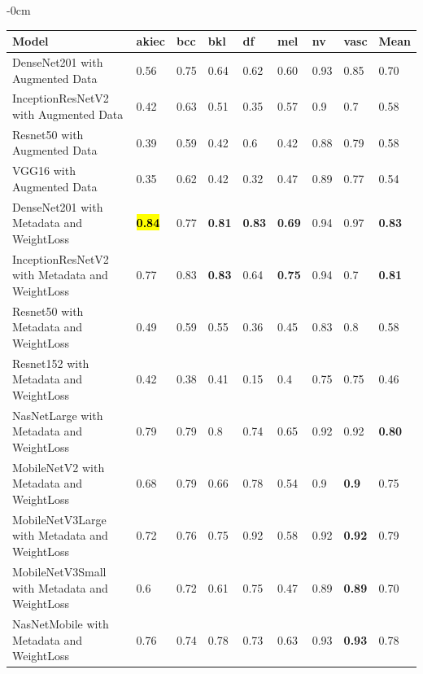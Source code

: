 \documentclass[sensors,article,accept,pdftex,moreauthors]{Definitions/mdpi}
\begin{document}
\begin{table}[H]
\begin{adjustwidth}{-\extralength}{0cm}
\centering
\begin{tabular}{p{9cm}  p{0.8cm}  p{0.8cm}  p{0.6cm}  p{0.6cm}  p{0.6cm}  p{0.6cm}  p{0.8cm}  p{0.9cm}} 
	\toprule
	\textbf{Model} & \textbf{akiec} & \textbf{bcc} & \textbf{bkl} & \textbf{df} & \textbf{mel} & \textbf{nv} & \textbf{vasc} & \textbf{Mean} \\
	\midrule
	DenseNet201 with Augmented Data & 0.56 & 0.75 & 0.64 & 0.62 & 0.60 & 0.93 & 0.85 & 0.70 \\ 
	\midrule
	InceptionResNetV2 with Augmented Data & 0.42 &	0.63 & 0.51 & 0.35 & 0.57 & 0.9 & 0.7 & 0.58\\
	\midrule
	Resnet50 with Augmented Data & 0.39 & 0.59 & 0.42 & 0.6 & 0.42 & 0.88 & 0.79 & 0.58\\
	\midrule 	
	VGG16 with Augmented Data & 0.35 & 0.62 & 0.42 & 0.32 & 0.47 & 0.89 & 0.77 & 0.54\\ 
	\midrule		
	DenseNet201 with Metadata and WeightLoss & \textbf{\hl{0.84} %
} & 0.77 & \textbf{0.81} & \textbf{0.83} & \textbf{0.69} & 0.94 & 0.97 & \textbf{0.83}\\
	\midrule
	InceptionResNetV2 with Metadata and WeightLoss & 0.77 & 0.83 & \textbf{0.83} & 0.64 & \textbf{0.75} & 0.94 & 0.7 & \textbf{0.81}\\
	\midrule
	Resnet50 with Metadata and WeightLoss & 0.49 & 0.59 & 0.55 & 0.36 & 0.45 & 0.83 & 0.8 & 0.58\\
	\midrule
	Resnet152 with Metadata and WeightLoss & 0.42 & 0.38 & 0.41 & 0.15 & 0.4 & 0.75 & 0.75 & 0.46\\
	\midrule
	NasNetLarge with Metadata and WeightLoss & 0.79 & 0.79 & 0.8 & 0.74 & 0.65 & 0.92 & 0.92 & \textbf{0.80}\\
	\midrule
	MobileNetV2 with Metadata and WeightLoss & 0.68 & 0.79 & 0.66 & 0.78 & 0.54 & 0.9 & \textbf{0.9} & 0.75\\
	\midrule
	MobileNetV3Large with Metadata and WeightLoss & 0.72 & 0.76 & 0.75 & 0.92 & 0.58 & 0.92 & \textbf{0.92} & 0.79\\
	\midrule
	MobileNetV3Small with Metadata and WeightLoss & 0.6 & 0.72 & 0.61 & 0.75 & 0.47 & 0.89 & \textbf{0.89} & 0.70\\
	\midrule
	NasNetMobile with Metadata and WeightLoss & 0.76 & 0.74 & 0.78 & 0.73 & 0.63 & 0.93 & \textbf{0.93} & 0.78\\
	\bottomrule
\end{tabular}
\end{adjustwidth}
		\end{table}
\end{document}
